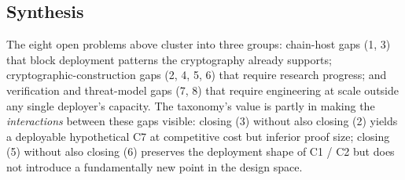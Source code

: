 \subsection{Synthesis}

The eight open problems above cluster into three groups: chain-host
gaps (1, 3) that block deployment patterns the cryptography already
supports; cryptographic-construction gaps (2, 4, 5, 6) that require
research progress; and verification and threat-model gaps (7, 8) that
require engineering at scale outside any single deployer's
capacity. The taxonomy's value is partly in making the
\emph{interactions} between these gaps visible: closing (3) without
also closing (2) yields a deployable hypothetical C7 at competitive
cost but inferior proof size; closing (5) without also closing (6)
preserves the deployment shape of C1 / C2 but does not introduce a
fundamentally new point in the design space.
